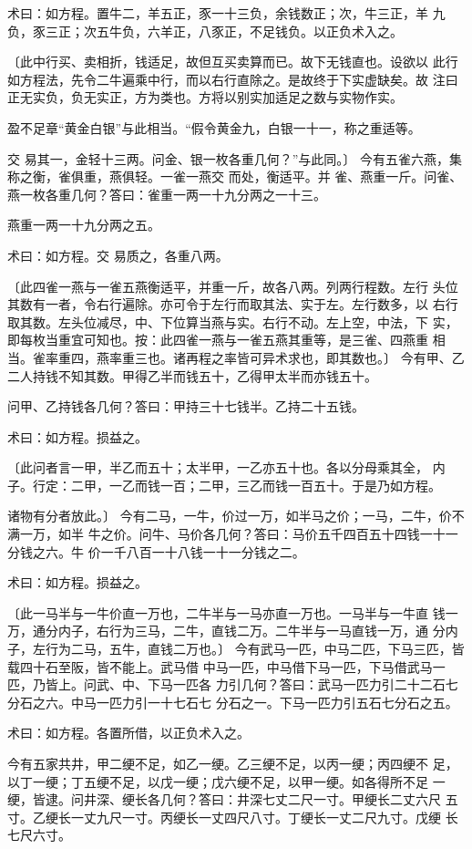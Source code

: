 \documentclass[12pt,UTF8]{ctexbook}
\begin{document}
术曰：如方程。置牛二，羊五正，豕一十三负，余钱数正；次，牛三正，羊 九负，豕三正；次五牛负，六羊正，八豕正，不足钱负。以正负术入之。

〔此中行买、卖相折，钱适足，故但互买卖算而已。故下无钱直也。设欲以 此行如方程法，先令二牛遍乘中行，而以右行直除之。是故终于下实虚缺矣。故 注曰正无实负，负无实正，方为类也。方将以别实加适足之数与实物作实。

盈不足章“黄金白银”与此相当。“假令黄金九，白银一十一，称之重适等。

交 易其一，金轻十三两。问金、银一枚各重几何？”与此同。〕 今有五雀六燕，集称之衡，雀俱重，燕俱轻。一雀一燕交 而处，衡适平。并 雀、燕重一斤。问雀、燕一枚各重几何？答曰：雀重一两一十九分两之一十三。

燕重一两一十九分两之五。

术曰：如方程。交 易质之，各重八两。

〔此四雀一燕与一雀五燕衡适平，并重一斤，故各八两。列两行程数。左行 头位其数有一者，令右行遍除。亦可令于左行而取其法、实于左。左行数多，以 右行取其数。左头位减尽，中、下位算当燕与实。右行不动。左上空，中法，下 实，即每枚当重宜可知也。按：此四雀一燕与一雀五燕其重等，是三雀、四燕重 相当。雀率重四，燕率重三也。诸再程之率皆可异术求也，即其数也。〕 今有甲、乙二人持钱不知其数。甲得乙半而钱五十，乙得甲太半而亦钱五十。

问甲、乙持钱各几何？答曰：甲持三十七钱半。乙持二十五钱。

术曰：如方程。损益之。

〔此问者言一甲，半乙而五十；太半甲，一乙亦五十也。各以分母乘其全， 内子。行定：二甲，一乙而钱一百；二甲，三乙而钱一百五十。于是乃如方程。

诸物有分者放此。〕 今有二马，一牛，价过一万，如半马之价；一马，二牛，价不满一万，如半 牛之价。问牛、马价各几何？答曰：马价五千四百五十四钱一十一分钱之六。牛 价一千八百一十八钱一十一分钱之二。

术曰：如方程。损益之。

〔此一马半与一牛价直一万也，二牛半与一马亦直一万也。一马半与一牛直 钱一万，通分内子，右行为三马，二牛，直钱二万。二牛半与一马直钱一万，通 分内子，左行为二马，五牛，直钱二万也。〕 今有武马一匹，中马二匹，下马三匹，皆载四十石至阪，皆不能上。武马借 中马一匹，中马借下马一匹，下马借武马一匹，乃皆上。问武、中、下马一匹各 力引几何？答曰：武马一匹力引二十二石七分石之六。中马一匹力引一十七石七 分石之一。下马一匹力引五石七分石之五。

术曰：如方程。各置所借，以正负术入之。

今有五家共井，甲二绠不足，如乙一绠。乙三绠不足，以丙一绠；丙四绠不 足，以丁一绠；丁五绠不足，以戊一绠；戊六绠不足，以甲一绠。如各得所不足 一绠，皆逮。问井深、绠长各几何？答曰：井深七丈二尺一寸。甲绠长二丈六尺 五寸。乙绠长一丈九尺一寸。丙绠长一丈四尺八寸。丁绠长一丈二尺九寸。戊绠 长七尺六寸。
\end{document}
